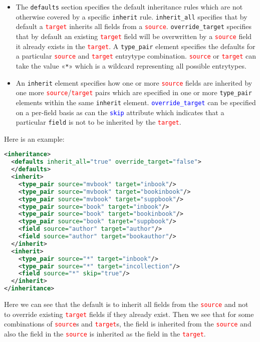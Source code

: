 \documentclass{ltxdockit}
\begin{document}
\begin{itemize}
\item The \texttt{defaults} section specifies the default inheritance rules
  which are not otherwise covered by a specific \texttt{inherit} rule.
  \texttt{inherit\_all} specifies that by default a
  \textcolor{red}{\texttt{target}} inherits all fields from a
  \textcolor{red}{\texttt{source}}. \texttt{override\_target} specifies
  that by default an existing \textcolor{red}{\texttt{target}} field will
  be overwritten by a \textcolor{red}{\texttt{source}} field it already
  exists in the \textcolor{red}{\texttt{target}}. A \texttt{type\_pair}
  element specifies the defaults for a particular
  \textcolor{red}{\texttt{source}} and \textcolor{red}{\texttt{target}}
  entrytype combination. \textcolor{red}{\texttt{source}} or
  \textcolor{red}{\texttt{target}} can take the value «\texttt{*}» which
  is a wildcard representing all possible entrytypes.
\item An \texttt{inherit} element specifies how one or more
  \textcolor{red}{\texttt{source}} fields are inherited by one more
  \textcolor{red}{\texttt{source}}/\textcolor{red}{\texttt{target}}
  pairs which are specified in one or more \texttt{type\_pair} elements
  within the same \texttt{inherit} element.
  \textcolor{blue}{\texttt{override\_target}} can be specified on a
  per-field basis as can the \textcolor{blue}{\texttt{skip}} attribute
  which indicates that a particular \texttt{field} is not to be inherited by
  the \textcolor{red}{\texttt{target}}.
\end{itemize}
%
Here is an example:

\begin{lstlisting}[language=xml,escapechar=+,mathescape=true]
<inheritance>
  <defaults inherit_all="true" override_target="false">
  </defaults>
  <inherit>
    <type_pair source="mvbook" target="inbook"/>
    <type_pair source="mvbook" target="bookinbook"/>
    <type_pair source="mvbook" target="suppbook"/>
    <type_pair source="book" target="inbook"/>
    <type_pair source="book" target="bookinbook"/>
    <type_pair source="book" target="suppbook"/>
    <field source="author" target="author"/>
    <field source="author" target="bookauthor"/>
  </inherit>
  <inherit>
    <type_pair source="*" target="inbook"/>
    <type_pair source="*" target="incollection"/>
    <field source="*" skip="true"/>
  </inherit>
</inheritance>
\end{lstlisting}
%
Here we can see that the default is to inherit all fields from the
\textcolor{red}{\texttt{source}} and not to override existing
\textcolor{red}{\texttt{target}} fields if they already exist. Then we see
that for some combinations of \textcolor{red}{\texttt{source}}s and
\textcolor{red}{\texttt{target}}s, the  field is inherited
from the \textcolor{red}{\texttt{source}} and also the 
field in the \textcolor{red}{\texttt{source}} is inherited as the
 field in the \textcolor{red}{\texttt{target}}.
\end{document}

